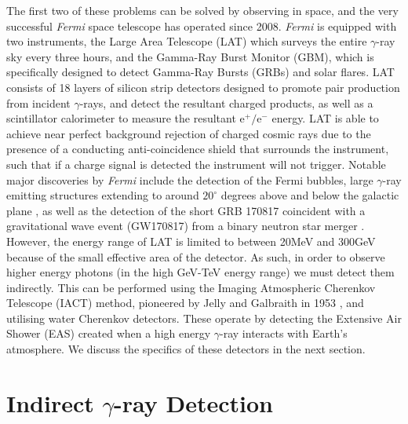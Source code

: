 The first two of these problems can be solved by observing in space, and the very successful \textit{Fermi} space telescope has operated since 2008. \textit{Fermi} is equipped with two instruments, the Large Area Telescope (LAT) which surveys the entire $\gamma$-ray sky every three hours, and the Gamma-Ray Burst Monitor (GBM), which is specifically designed to detect Gamma-Ray Bursts (GRBs) and solar flares. LAT consists of 18 layers of silicon strip detectors designed to promote pair production from incident $\gamma$-rays, and detect the resultant charged products, as well as a scintillator calorimeter to measure the resultant $\mathrm{e^+/e^-}$ energy. LAT is able to achieve near perfect background rejection of charged cosmic rays due to the presence of a conducting anti-coincidence shield that surrounds the instrument, such that if a charge signal is detected the instrument will not trigger. Notable major discoveries by \textit{Fermi} include the detection of the Fermi bubbles, large $\gamma$-ray emitting structures extending to around $\mathrm{20^{\circ}}$ degrees above and below the galactic plane \cite{hooperslayter}, as well as the detection of the short GRB 170817 coincident with a gravitational wave event (GW170817) from a binary neutron star merger \cite{ligogrb}. However, the energy range of LAT is limited to between 20MeV and 300GeV because of the small effective area of the detector. As such, in order to observe higher energy photons (in the high GeV-TeV energy range) we must detect them indirectly. This can be performed using the Imaging Atmospheric Cherenkov Telescope  (IACT) method, pioneered by Jelly and Galbraith in 1953 \cite{G+J}, and utilising water Cherenkov detectors. These operate by detecting the Extensive Air Shower (EAS) created when a high energy $\gamma$-ray interacts with Earth's atmosphere. We discuss the specifics of these detectors in the next section. 

\section{Indirect \ensuremath{\gamma}-ray Detection}
